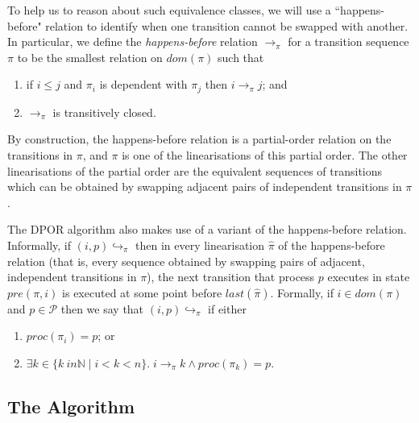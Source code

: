 \documentclass[12pt,a4paper,twoside,openright]{report}
\begin{document}
To help us to reason about such equivalence classes,
we will use a ``happens-before" relation to identify
when one transition cannot be swapped with another.
In particular, we define the \emph{happens-before}
relation $\longrightarrow_\pi$ for a transition
sequence $\pi$ to be the smallest relation on
$\textit{dom}(\pi)$ such that
\begin{enumerate}
	\item if $i \leq j$ and $\pi_i$ is dependent with
		$\pi_j$ then $i \longrightarrow_\pi j$; and
	\item $\longrightarrow_\pi$ is transitively closed.
\end{enumerate}

By construction, the happens-before relation is a
partial-order relation on the transitions in $\pi$,
and $\pi$ is one of the linearisations of this
partial order. The other linearisations of the
partial order are the equivalent sequences of
transitions which can be obtained by swapping
adjacent pairs of independent transitions in $\pi$.

The DPOR algorithm also makes use of a variant of the
happens-before relation.
Informally, if $(i, p)\!\hookrightarrow_\pi$ then
in every linearisation $\hat{\pi}$ of the
happens-before relation (that is, every sequence
obtained by swapping pairs of adjacent,
independent transitions in $\pi$), the next
transition that process $p$ executes in
state $\textit{pre}(\pi, i)$ is executed
at some point before $\textit{last}(\hat{\pi})$.
Formally, 
if $i \in \textit{dom}(\pi)$ and $p \in
\mathcal{P}$ then we
say that $(i, p)\!\hookrightarrow_\pi$ if
either
\begin{enumerate}
	\item $\textit{proc}(\pi_i) = p$; or
	\item $\exists k \in \{k \ in \mathbb{N} \mid i < k < n\}.\;
		i \longrightarrow_\pi k \wedge \textit{proc}(\pi_k) = p$.
\end{enumerate}


\subsection{The Algorithm}
\end{document}
